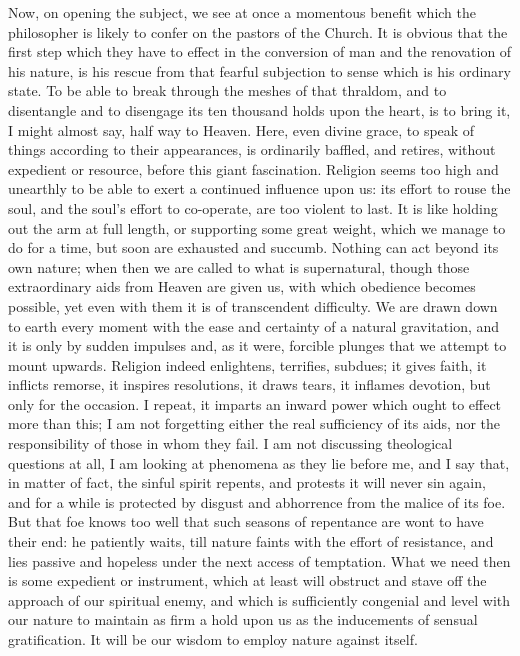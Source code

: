Now, on opening the subject, we see at once a momentous benefit
which the philosopher is likely to confer on the pastors of the
Church. It is obvious that the first step which they have to effect in
the conversion of man and the renovation of his nature, is his rescue
from that fearful subjection to sense which is his ordinary state. To
be able to break through the meshes of that thraldom, and to
disentangle and to disengage its ten thousand holds upon the heart, is
to bring it, I might almost say, half way to Heaven. Here, even divine
grace, to speak of things according to their appearances, is
ordinarily baffled, and retires, without expedient or resource, before
this giant fascination. Religion seems too high and unearthly to be
able to exert a continued influence upon us: its effort to rouse the
soul, and the soul's effort to co-operate, are too violent to last. It
is like holding out the arm at full length, or supporting some great
weight, which we manage to do for a time, but soon are exhausted and
succumb. Nothing can act beyond its own nature; when then we are
called to what is supernatural, though those extraordinary aids from
Heaven are given us, with which obedience becomes possible, yet even
with them it is of transcendent difficulty. We are drawn down to earth
every moment with the ease and certainty of a natural gravitation, and
it is only by sudden impulses and, as it were, forcible plunges that
we attempt to mount upwards. Religion indeed enlightens, terrifies,
subdues; it gives faith, it inflicts remorse, it inspires resolutions,
it draws tears, it inflames devotion, but only for the occasion.
I repeat, it imparts an inward power which ought to effect more than
this; I am not forgetting either the real sufficiency of its aids, nor
the responsibility of those in whom they fail. I am not discussing
theological questions at all, I am looking at phenomena as they lie
before me, and I say that, in matter of fact, the sinful spirit
repents, and protests it will never sin again, and for a while is
protected by disgust and abhorrence from the malice of its foe. But
that foe knows too well that such seasons of repentance are wont to
have their end: he patiently waits, till nature faints with the effort
of resistance, and lies passive and hopeless under the next access of
temptation. What we need then is some expedient or instrument, which
at least will obstruct and stave off the approach of our spiritual
enemy, and which is sufficiently congenial and level with our nature
to maintain as firm a hold upon us as the inducements of sensual
gratification. It will be our wisdom to employ nature against itself.
